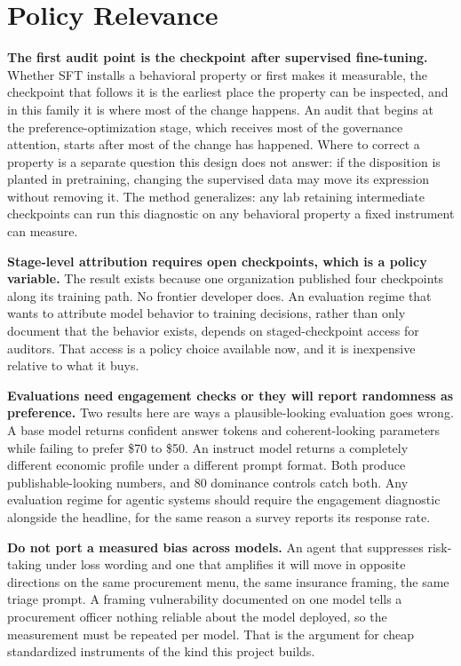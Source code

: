\documentclass[11pt]{article}
\begin{document}
\section{Policy Relevance}

\textbf{The first audit point is the checkpoint after supervised fine-tuning.} Whether SFT installs a
behavioral property or first makes it measurable, the checkpoint that follows it is the earliest place
the property can be inspected, and in this family it is where most of the change happens. An audit that
begins at the preference-optimization stage, which receives most of the governance attention, starts
after most of the change has happened. Where to correct a property is a separate question this design does not
answer: if the disposition is planted in pretraining, changing the supervised data may move its
expression without removing it. The method generalizes: any lab retaining intermediate checkpoints can
run this diagnostic on any behavioral property a fixed instrument can measure.

\textbf{Stage-level attribution requires open checkpoints, which is a policy variable.} The result exists
because one organization published four checkpoints along its training path. No frontier developer does.
An evaluation regime that wants to attribute model behavior to training decisions, rather than only
document that the behavior exists, depends on staged-checkpoint access for auditors. That access is a
policy choice available now, and it is inexpensive relative to what it buys.

\textbf{Evaluations need engagement checks or they will report randomness as preference.} Two results here
are ways a plausible-looking evaluation goes wrong. A base model returns confident answer tokens and
coherent-looking parameters while failing to prefer \$70 to \$50. An instruct model returns a completely
different economic profile under a different prompt format. Both produce publishable-looking numbers,
and 80 dominance controls catch both. Any evaluation regime for agentic systems should require the
engagement diagnostic alongside the headline, for the same reason a survey reports its response rate.

\textbf{Do not port a measured bias across models.} An agent that suppresses risk-taking under loss
wording and one that amplifies it will move in opposite directions on the same procurement menu, the
same insurance framing, the same triage prompt. A framing vulnerability documented on one model tells a
procurement officer nothing reliable about the model deployed, so the measurement must be repeated per
model. That is the argument for cheap standardized instruments of the kind this project builds.
\end{document}
